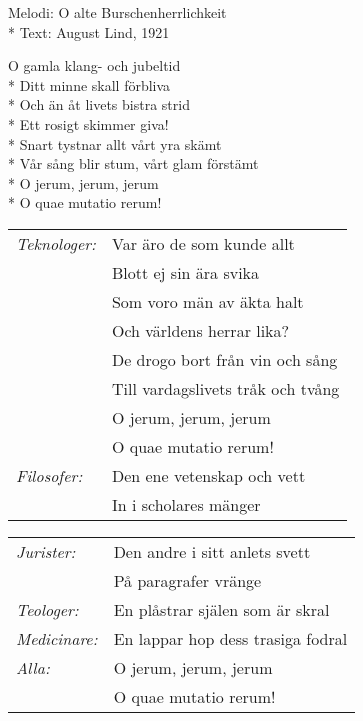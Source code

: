 \begin{SongText}
    \begin{SongInfo}
        Melodi: O alte Burschenherrlichkeit\\*
        Text: August Lind, 1921
    \end{SongInfo}
    \begin{SongVerse}
        O gamla klang- och jubeltid\\*
        Ditt minne skall förbliva\\*
        Och än åt livets bistra strid\\*
        Ett rosigt skimmer giva!\\*
        Snart tystnar allt vårt yra skämt\\*
        Vår sång blir stum, vårt glam förstämt\\*
        O jerum, jerum, jerum\\*
        O quae mutatio rerum!
    \end{SongVerse}

    

    \begin{longtable}{p{}p{}}
        \textit{Teknologer:}&Var äro de som kunde allt\\*
        &Blott ej sin ära svika\\*
        &Som voro män av äkta halt\\*
        &Och världens herrar lika?\\*
        &De drogo bort från vin och sång\\*
        &Till vardagslivets tråk och tvång\\*
        &O jerum, jerum, jerum\\*
        &O quae mutatio rerum!\\*
        \textit{Filosofer:}&Den ene vetenskap och vett\\*
        &In i scholares mänger\\*
    \end{longtable}
    \begin{longtable}{p{}p{}}
        \textit{Jurister:}&Den andre i sitt anlets svett\\*
        &På paragrafer vränge\\*
        \textit{Teologer:}&En plåstrar själen som är skral\\*
        \textit{Medicinare:}&En lappar hop dess trasiga fodral\\*
        \textit{Alla:}&O jerum, jerum, jerum\\*
        &O quae mutatio rerum!
        

\end{longtable}
\end{SongText}
